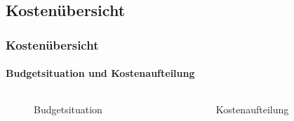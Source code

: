 %				

\subsection{Kostenübersicht}
\begin{frame}
	\frametitle{Kostenübersicht\hfill{}\footnotesize \group}
	\framesubtitle{Budgetsituation und Kostenaufteilung}
%	
	
	\begin{columns}
		\begin{column}{0.5\textwidth}
			\begin{figure}
				\caption{Budgetsituation}
			\end{figure}
		\end{column}
		\begin{column}{0.5\textwidth}
			\begin{figure}
				\caption{Kostenaufteilung}
			\end{figure}

		\end{column}
	\end{columns}
\end{frame}
